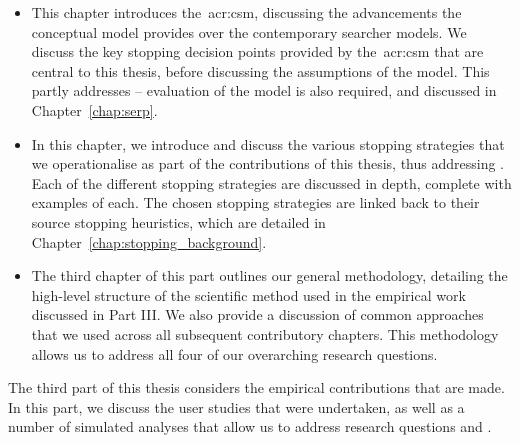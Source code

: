 \begin{itemize}
    \item[]{ This chapter introduces the~\gls{acr:csm}, discussing the advancements the conceptual model provides over the contemporary searcher models. We discuss the key stopping decision points provided by the~\gls{acr:csm} that are central to this thesis, before discussing the assumptions of the model. This partly addresses  -- evaluation of the model is also required, and discussed in Chapter~\ref{chap:serp}.}
    
    \item[]{ In this chapter, we introduce and discuss the various stopping strategies that we operationalise as part of the contributions of this thesis, thus addressing . Each of the different stopping strategies are discussed in depth, complete with examples of each. The chosen stopping strategies are linked back to their source stopping heuristics, which are detailed in Chapter~\ref{chap:stopping_background}.}
    
    \item[]{ The third chapter of this part outlines our general methodology, detailing the high-level structure of the scientific method used in the empirical work discussed in Part III. We also provide a discussion of common approaches that we used across all subsequent contributory chapters. This methodology allows us to address all four of our overarching research questions.}
\end{itemize}

\noindent
{}
The third part of this thesis considers the empirical contributions that are made. In this part, we discuss the user studies that were undertaken, as well as a number of simulated analyses that allow us to address research questions  and .

